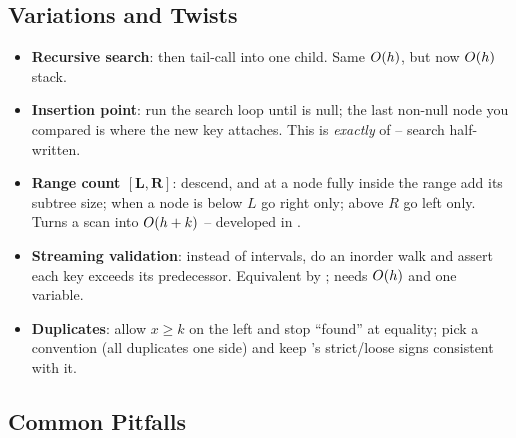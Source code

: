 \subsection{Variations and Twists}

\begin{itemize}[nosep]
  \item \textbf{Recursive search}:  then tail-call
        into one child. Same $O(h)$, but now $O(h)$ stack. \hfill{}
  \item \textbf{Insertion point}: run the search loop until  is null; the last non-null
        node you compared is where the new key attaches. This is \emph{exactly} 
        of  -- search half-written. \hfill{}
  \item \textbf{Range count $\mathbf{[L,R]}$}: descend, and at a node fully inside the range add its
        subtree size; when a node is below $L$ go right only; above $R$ go left only. Turns a scan
        into $O(h + k)$ -- developed in . \hfill{}
  \item \textbf{Streaming validation}: instead of intervals, do an inorder walk and assert each key
        exceeds its predecessor. Equivalent by ; needs $O(h)$ and one
         variable. \hfill{}
  \item \textbf{Duplicates}: allow $x\ge k$ on the left and stop ``found'' at equality; pick a
        convention (all duplicates one side) and keep 's strict/loose signs
        consistent with it. \hfill{}
\end{itemize}

\subsection{Common Pitfalls}\label{sec:c05-property-pitfalls}

